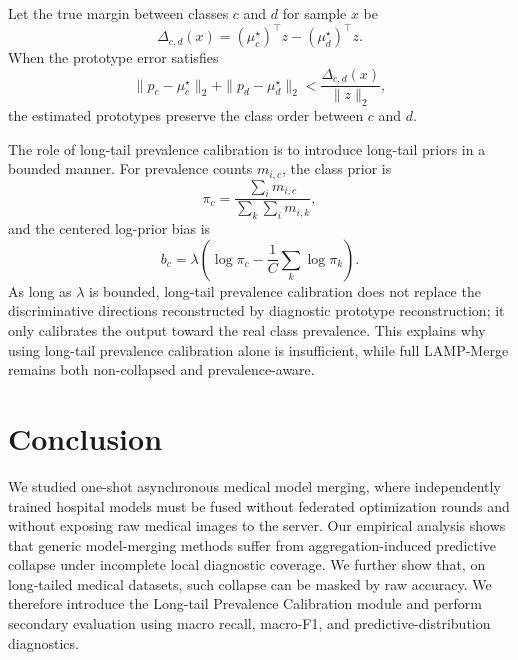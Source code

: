 \documentclass[letterpaper]{article} %
\begin{document}
Let the true margin between classes $c$ and $d$ for sample $x$ be
\begin{equation}
\Delta_{c,d}(x)=(\mu_c^\star)^\top z-(\mu_d^\star)^\top z.
\end{equation}
When the prototype error satisfies
\begin{equation}
\|p_c-\mu_c^\star\|_2+\|p_d-\mu_d^\star\|_2
<
\frac{\Delta_{c,d}(x)}{\|z\|_2},
\end{equation}
the estimated prototypes preserve the class order between $c$ and $d$.

The role of long-tail prevalence calibration is to introduce long-tail priors in a bounded manner. For prevalence counts $m_{i,c}$, the class prior is
\begin{equation}
\pi_c=\frac{\sum_i m_{i,c}}{\sum_k \sum_i m_{i,k}},
\end{equation}
and the centered log-prior bias is
\begin{equation}
b_c=\lambda\left(\log\pi_c-\frac{1}{C}\sum_k\log\pi_k\right).
\end{equation}
As long as $\lambda$ is bounded, long-tail prevalence calibration does not replace the discriminative directions reconstructed by diagnostic prototype reconstruction; it only calibrates the output toward the real class prevalence. This explains why using long-tail prevalence calibration alone is insufficient, while full LAMP-Merge remains both non-collapsed and prevalence-aware.

\section{Conclusion}

We studied one-shot asynchronous medical model merging, where independently trained hospital models must be fused without federated optimization rounds and without exposing raw medical images to the server. Our empirical analysis shows that generic model-merging methods suffer from aggregation-induced predictive collapse under incomplete local diagnostic coverage. We further show that, on long-tailed medical datasets, such collapse can be masked by raw accuracy. We therefore introduce the Long-tail Prevalence Calibration module and perform secondary evaluation using macro recall, macro-F1, and predictive-distribution diagnostics\cite{BUDA2018249,5597285}.
\end{document}
